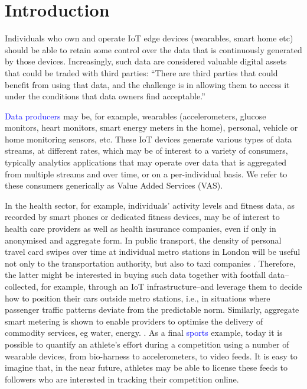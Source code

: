 \documentclass[chi_draft]{sigchi}
\begin{document}
\section{Introduction}

Individuals who own and operate IoT edge devices (wearables, smart home etc) should be able to retain some control over the data that is continuously generated by those devices.
Increasingly, such data are considered valuable digital assets that could be traded with third parties:  ``There are third parties that could benefit from using that data, and the challenge is in allowing them to access it under the conditions that data owners find acceptable.'' 


\textcolor{blue}{Data producers} may be, for example, wearables (accelerometers, glucose monitors, heart monitors, smart energy meters in the home), personal, vehicle or home monitoring sensors, etc.
These IoT devices generate various types of data streams, at different rates, which may be of interest to a variety of consumers, typically analytics applications that may operate over data that is aggregated from multiple streams and over time, or on a per-individual basis.
We refer to these consumers generically as Value Added Services (VAS).

In the health sector, for example, individuals' activity levels and fitness data, as recorded by smart phones or dedicated fitness devices, may be of interest to health care providers as well as health insurance companies, even if only in anonymised and aggregate form.
%
In public transport, the density of personal travel card swipes over time at individual metro stations in London will be %
useful not only to the transportation authority, but also to taxi companies%
. Therefore, the latter might be interested in buying such data together with footfall data--collected, for example, through an IoT infrastructure--and leverage them to decide how to position their cars outside metro stations, i.e., in situations where passenger traffic patterns deviate from the predictable norm.
%
 Similarly, aggregate smart metering is shown to enable providers to optimise the delivery of commodity services, eg water, energy.  .
%
As a final \textcolor{blue}{sports} example, today it is possible to quantify an athlete's effort during a competition using a number of wearable devices, from bio-harness to accelerometers, to video feeds. 
It is easy to imagine that, in the near future, athletes may be able to license these feeds to followers who are interested in tracking their competition online.
\end{document}
